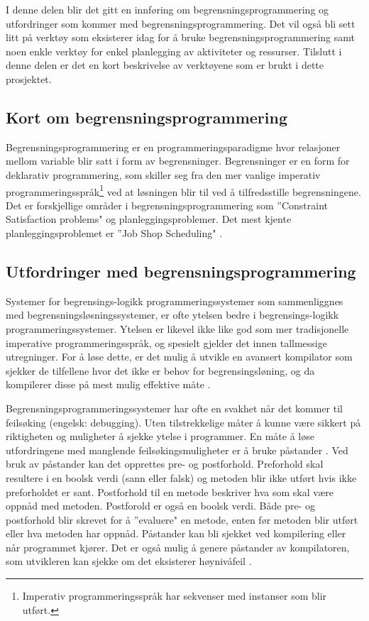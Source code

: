 I denne delen blir det gitt en innføring om begrensningsprogrammering og utfordringer som kommer med begrensningsprogrammering. Det vil også bli sett litt på verktøy som eksisterer idag for å bruke begrensningsprogrammering samt noen enkle verktøy for enkel planlegging av aktiviteter og ressurser. Tilslutt i denne delen er det en kort beskrivelse av verktøyene som er brukt i dette prosjektet.

\subsection{Kort om begrensningsprogrammering}
Begrensningsprogrammering er en programmeringsparadigme hvor relasjoner mellom variable blir satt i form av begrensninger. Begrensninger er en form for deklarativ programmering, som skiller seg fra den mer vanlige imperativ programmeringsspråk\footnote{Imperativ programmeringsspråk har sekvenser med instanser som blir utført.} ved at løsningen blir til ved å tilfredsstille begrensningene. Det er forskjellige områder i begrensningsprogrammering som ''Constraint Satisfaction problems" og planleggingsproblemer. Det mest kjente planleggingsproblemet er ''Job Shop Scheduling" \cite{cpwikipedia}. 

\subsection{Utfordringer med begrensningsprogrammering}
Systemer for begrensings-logikk programmeringssystemer som sammenliggnes med begrensningsløsningssystemer, er ofte ytelsen bedre i begrensings-logikk programmeringssystemer. Ytelsen er likevel ikke like god som mer tradisjonelle imperative programmeringsspråk, og spesielt gjelder det innen tallmessige utregninger. For å løse dette, er det mulig å utvikle en avansert kompilator som sjekker de tilfellene hvor det ikke er behov for begrensingsløning, og da kompilerer disse på mest mulig effektive måte \cite{challengesManuel}.

Begrensningsprogrammeringssystemer har ofte en svakhet når det kommer til feilsøking (engelsk: debugging). Uten tilstrekkelige måter å kunne være sikkert på riktigheten og muligheter å sjekke ytelse i programmer. En måte å løse utfordringene med manglende feilsøkingsmuligheter er å bruke påstander . Ved bruk av påstander kan det opprettes pre- og postforhold. Preforhold skal resultere i en boolsk verdi (sann eller falsk) og metoden blir ikke utført hvis ikke preforholdet er sant. Postforhold til en metode beskriver hva som skal være oppnåd med metoden. Postforold er også en boolsk verdi. Både pre- og postforhold blir skrevet for å ''evaluere" en metode, enten før metoden blir utført eller hva metoden har oppnåd. Påstander kan bli sjekket ved kompilering eller når programmet kjører. Det er også mulig å genere påstander av kompilatoren, som utvikleren kan sjekke om det eksisterer høynivåfeil \cite{challengesManuel}.

